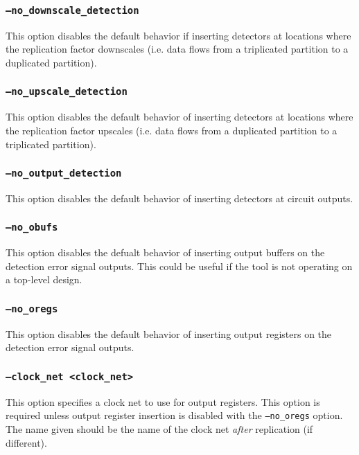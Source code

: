 \subsubsection{\texttt{--no\_downscale\_detection}}
This option disables the default behavior if inserting detectors at locations
where the replication factor downscales (i.e. data flows from a triplicated
partition to a duplicated partition).

\subsubsection{\texttt{--no\_upscale\_detection}}
This option disables the default behavior of inserting detectors at locations
where the replication factor upscales (i.e. data flows from a duplicated
partition to a triplicated partition).

\subsubsection{\texttt{--no\_output\_detection}}
This option disables the default behavior of inserting detectors at circuit
outputs.

\subsubsection{\texttt{--no\_obufs}}
This option disables the defualt behavior of inserting output buffers on the
detection error signal outputs. This could be useful if the tool is not
operating on a top-level design.

\subsubsection{\texttt{--no\_oregs}}
This option disables the default behavior of inserting output registers on the
detection error signal outputs.

\subsubsection{\texttt{--clock\_net <clock\_net>}}
This option specifies a clock net to use for output registers. This option is
required unless output register insertion is disabled with the
\texttt{--no\_oregs} option. The name given should be the name of the clock net
\emph{after} replication (if different).




